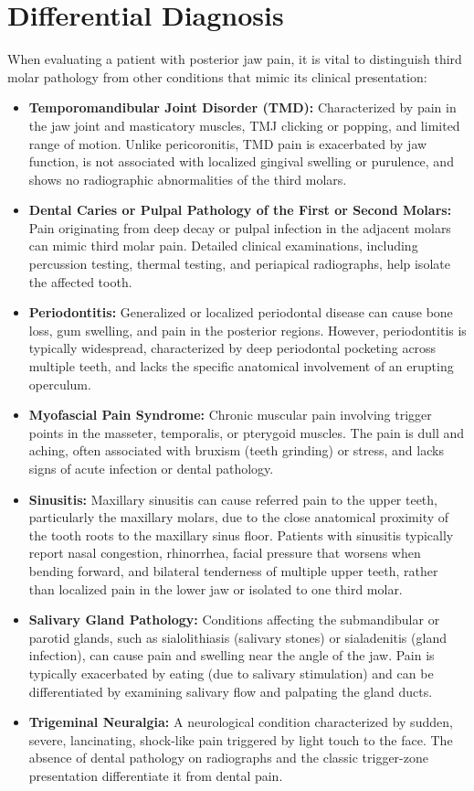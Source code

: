 \section*{Differential Diagnosis}
When evaluating a patient with posterior jaw pain, it is vital to distinguish third molar pathology from other conditions that mimic its clinical presentation:

\begin{itemize}
    \item \textbf{Temporomandibular Joint Disorder (TMD):} Characterized by pain in the jaw joint and masticatory muscles, TMJ clicking or popping, and limited range of motion. Unlike pericoronitis, TMD pain is exacerbated by jaw function, is not associated with localized gingival swelling or purulence, and shows no radiographic abnormalities of the third molars.
    \item \textbf{Dental Caries or Pulpal Pathology of the First or Second Molars:} Pain originating from deep decay or pulpal infection in the adjacent molars can mimic third molar pain. Detailed clinical examinations, including percussion testing, thermal testing, and periapical radiographs, help isolate the affected tooth.
    \item \textbf{Periodontitis:} Generalized or localized periodontal disease can cause bone loss, gum swelling, and pain in the posterior regions. However, periodontitis is typically widespread, characterized by deep periodontal pocketing across multiple teeth, and lacks the specific anatomical involvement of an erupting operculum.
    \item \textbf{Myofascial Pain Syndrome:} Chronic muscular pain involving trigger points in the masseter, temporalis, or pterygoid muscles. The pain is dull and aching, often associated with bruxism (teeth grinding) or stress, and lacks signs of acute infection or dental pathology.
    \item \textbf{Sinusitis:} Maxillary sinusitis can cause referred pain to the upper teeth, particularly the maxillary molars, due to the close anatomical proximity of the tooth roots to the maxillary sinus floor. Patients with sinusitis typically report nasal congestion, rhinorrhea, facial pressure that worsens when bending forward, and bilateral tenderness of multiple upper teeth, rather than localized pain in the lower jaw or isolated to one third molar.
    \item \textbf{Salivary Gland Pathology:} Conditions affecting the submandibular or parotid glands, such as sialolithiasis (salivary stones) or sialadenitis (gland infection), can cause pain and swelling near the angle of the jaw. Pain is typically exacerbated by eating (due to salivary stimulation) and can be differentiated by examining salivary flow and palpating the gland ducts.
    \item \textbf{Trigeminal Neuralgia:} A neurological condition characterized by sudden, severe, lancinating, shock-like pain triggered by light touch to the face. The absence of dental pathology on radiographs and the classic trigger-zone presentation differentiate it from dental pain.
\end{itemize}

